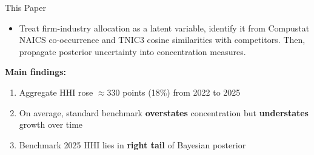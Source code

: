 \documentclass[aspectratio=169]{beamer}
\begin{document}

\begin{frame}{This Paper}

  \begin{itemize}
    \item Treat firm-industry allocation as a latent variable, identify it from Compustat NAICS co-occurrence and TNIC3 cosine similarities with competitors. Then, propagate posterior uncertainty into concentration measures.
  \end{itemize}

  \vspace{1.5em}

  \textbf{Main findings:}
  \begin{enumerate}
    \item Aggregate HHI rose $\approx$330 points (18\%) from 2022 to 2025
    \item On average, standard benchmark \textbf{overstates} concentration but \textbf{understates} growth over time
    \item Benchmark 2025 HHI lies in \textbf{right tail} of Bayesian posterior
  \end{enumerate}

\end{frame}

\end{document}

